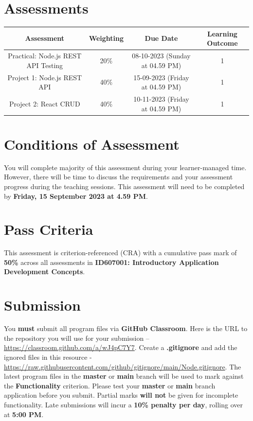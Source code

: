 \documentclass{article}
\begin{document}
\section*{Assessments}
\renewcommand{\arraystretch}{1.5}
\begin{tabular}{|c|c|c|c|}
	\hline
	\textbf{Assessment}                                 & \textbf{Weighting} & \textbf{Due Date}            & \textbf{Learning Outcome} \\ \hline
	\small Practical: Node.js REST API Testing & \small 20\%        & \small 08-10-2023 (Sunday at 04.59 PM)   & \small 1                   \\ \hline
	\small Project 1: Node.js REST API                  & \small 40\%        & \small 15-09-2023 (Friday at 04.59 PM) \small  & \small 1                   \\ \hline
	\small Project 2: React CRUD                        & \small 40\%        & \small 10-11-2023 (Friday at 04.59 PM)  & \small 1                   \\ \hline
\end{tabular}


\section*{Conditions of Assessment}
You will complete majority of this assessment during your learner-managed time. However, there will be time to discuss the requirements and your assessment progress during the teaching sessions. This assessment will need to be completed by \textbf{Friday, 15 September 2023 at 4.59 PM}.

\section*{Pass Criteria}
This assessment is criterion-referenced (CRA) with a cumulative pass mark of \textbf{50\%} across all assessments in \textbf{ID607001: Introductory Application Development Concepts}.

\section*{Submission}
You \textbf{must} submit all program files via \textbf{GitHub Classroom}. Here is the URL to the repository you will use for your submission – \href{https://classroom.github.com/a/wJ4pC7Y7}{https://classroom.github.com/a/wJ4pC7Y7}. Create a \textbf{.gitignore} and add the ignored files in this resource - \href{https://raw.githubusercontent.com/github/gitignore/main/Node.gitignore}{https://raw.githubusercontent.com/github/gitignore/main/Node.gitignore}. The latest program files in the \textbf{master} or \textbf{main} branch will be used to mark against the \textbf{Functionality} criterion. Please test your \textbf{master} or \textbf{main} branch application before you submit. Partial marks \textbf{will not} be given for incomplete functionality. Late submissions will incur a \textbf{10\% penalty per day}, rolling over at \textbf{5:00 PM}.
\end{document}
